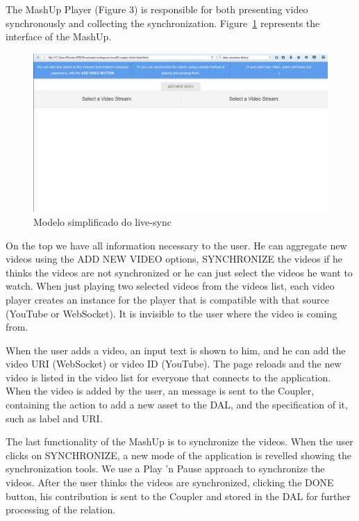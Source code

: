 \documentclass{sig-alternate-05-2015}
\begin{document}
The MashUp Player (Figure 3) is responsible for both presenting video synchronously and collecting the synchronization. Figure~\ref{screen1} represents the interface of the MashUp.

\begin{figure}
	\centerline{\includegraphics[scale=0.17] {figure/screen}}
	\caption{Modelo simplificado do live-sync}
	\label{screen1}
\end{figure}

On the top we have all information necessary to the user. He can aggregate new videos using the ADD NEW VIDEO options, SYNCHRONIZE the videos if he thinks the videos are not synchronized or he can just select the videos he want to watch. When just playing two selected videos from the videos list, each video player creates an instance for the player that is compatible with that source (YouTube or WebSocket). It is invisible to the user where the video is coming from.

When the user adds a video, an input text is shown to him, and he can add the video URI (WebSocket) or video ID (YouTube). The page reloads and the new video is listed in the video list for everyone that connects to the application. When the video is added by the user, an message is sent to the Coupler, containing the action to add a new asset to the DAL, and the specification of it, such as label and URI.

The last functionality of the MashUp is to synchronize the videos. When the user clicks on SYNCHRONIZE, a new mode of the application is revelled showing the synchronization tools. We use a Play 'n Pause approach to synchronize the videos. After the user thinks the videos are synchronized, clicking the DONE button, his contribution is sent to the Coupler and stored in the DAL for further processing of the relation.
\end{document}
